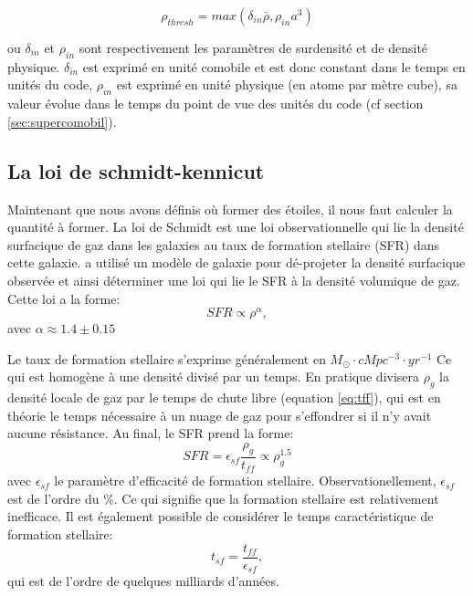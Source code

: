 
\begin{equation}
	\rho_{thresh} = max\left(  \delta_{in} \bar{\rho}, \rho_{in} a^3 \right)
\end{equation} 

ou $\delta_{in}$ et $\rho_{in}$  sont respectivement les paramètres de surdensité et de densité physique.
$\delta_{in}$ est exprimé en unité comobile et est donc constant dans le temps en unités du code,
 $\rho_{in}$ est exprimé en unité physique (en atome par mètre cube), sa valeur évolue dans le temps du point de vue des unités du code (cf section \ref{sec:supercomobil}).


\subsection{La loi de schmidt-kennicut}
\label{sec:schmidt-kennicut}

Maintenant que nous avons définis où former des étoiles, il nous faut calculer la quantité à former.
La loi de Schmidt \citep{1959ApJ...129..243S}  est une loi observationnelle qui lie la densité surfacique de gaz dans les galaxies au taux de formation stellaire (\ac{SFR}) dans cette galaxie.
\cite{1998ApJ...498..541K} a utilisé un modèle de galaxie pour dé-projeter la densité surfacique observée et ainsi déterminer une loi qui lie le \ac{SFR} à la densité volumique de gaz.
Cette loi a la forme:
\begin{equation}
SFR \propto \rho ^{\alpha},
\end{equation}
avec $\alpha \approx 1.4 \pm 0.15$

Le taux de formation stellaire s'exprime généralement en $M_\odot \cdot cMpc^{-3} \cdot yr^{-1}$  
Ce qui est homogène à une densité divisé par un temps.
En pratique divisera $\rho_g$ la densité locale de gaz par le temps de chute libre (equation \ref{eq:tff}), qui est en théorie le temps nécessaire à un nuage de gaz pour s'effondrer si il n'y avait aucune résistance.
Au final, le \ac{SFR} prend la forme:
\begin{equation}
	SFR = \epsilon_{sf} \frac{\rho_g}{t_{ff}} \propto \rho_g^{1.5}
    \label{eq_sfr}
\end{equation}
avec  $\epsilon_{sf}$ le paramètre d'efficacité de formation stellaire.
Observationellement, $\epsilon_{sf}$  est de l'ordre du \%. %
Ce qui signifie que la formation stellaire est relativement inefficace.
Il est également possible de considérer le temps caractéristique de formation stellaire:
\begin{equation}
t_{sf} =  \frac{t_{ff}}{ \epsilon_{sf} },
\end{equation}
qui est de l'ordre de quelques milliards d'années.



